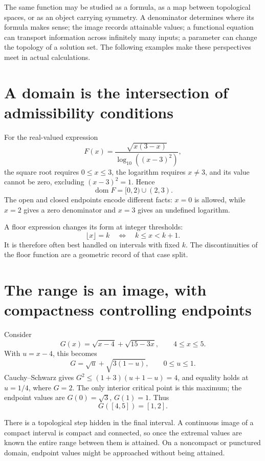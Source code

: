 
The same function may be studied as a formula, as a map between topological spaces, or as an object carrying symmetry. A denominator determines where its formula makes sense; the image records attainable values; a functional equation can transport information across infinitely many inputs; a parameter can change the topology of a solution set. The following examples make these perspectives meet in actual calculations.

\section{A domain is the intersection of admissibility conditions}

For the real-valued expression
\[
 F(x)=\frac{\sqrt{x(3-x)}}{\log_{10}((x-3)^2)},
\]
the square root requires \(0\le x\le3\), the logarithm requires \(x\ne3\), and its value cannot be zero, excluding \((x-3)^2=1\). Hence
\[
 \operatorname{dom}F=[0,2)\cup(2,3).
\]
The open and closed endpoints encode different facts: \(x=0\) is allowed, while \(x=2\) gives a zero denominator and \(x=3\) gives an undefined logarithm.

A floor expression changes its form at integer thresholds:
\[
 \lfloor x\rfloor=k\quad\Longleftrightarrow\quad k\le x<k+1.
\]
It is therefore often best handled on intervals with fixed \(k\). The discontinuities of the floor function are a geometric record of that case split.

\section{The range is an image, with compactness controlling endpoints}

Consider
\[
 G(x)=\sqrt{x-4}+\sqrt{15-3x},\qquad 4\le x\le5.
\]
With \(u=x-4\), this becomes
\[
 G=\sqrt u+\sqrt{3(1-u)},\qquad 0\le u\le1.
\]
Cauchy--Schwarz gives \(G^2\le(1+3)(u+1-u)=4\), and equality holds at \(u=1/4\), where \(G=2\). The only interior critical point is this maximum; the endpoint values are \(G(0)=\sqrt3\), \(G(1)=1\). Thus
\[
 \boxed{G([4,5])=[1,2].}
\]

There is a topological step hidden in the final interval. A continuous image of a compact interval is compact and connected, so once the extremal values are known the entire range between them is attained. On a noncompact or punctured domain, endpoint values might be approached without being attained.

